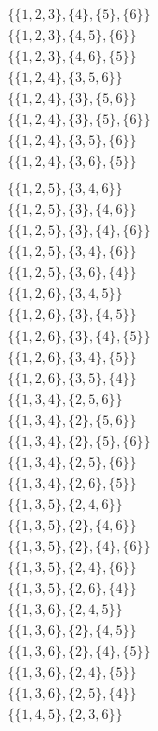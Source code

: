 \documentclass[11pt]{article}
\begin{document}
\begin{flushleft}
\begin{align*}
\{\{1, 2, 3\}, \{4\}, \{5\}, \{6\}\}\\
\{\{1, 2, 3\}, \{4, 5\}, \{6\}\}\\
\{\{1, 2, 3\}, \{4, 6\}, \{5\}\}\\
\{\{1, 2, 4\}, \{3, 5, 6\}\}\\
\{\{1, 2, 4\}, \{3\}, \{5, 6\}\}\\
\{\{1, 2, 4\}, \{3\}, \{5\}, \{6\}\}\\
\{\{1, 2, 4\}, \{3, 5\}, \{6\}\}\\
\{\{1, 2, 4\}, \{3, 6\}, \{5\}\}\\
\end{align*}
\begin{align*}
\{\{1, 2, 5\}, \{3, 4, 6\}\}\\
\{\{1, 2, 5\}, \{3\}, \{4, 6\}\}\\
\{\{1, 2, 5\}, \{3\}, \{4\}, \{6\}\}\\
\{\{1, 2, 5\}, \{3, 4\}, \{6\}\}\\
\{\{1, 2, 5\}, \{3, 6\}, \{4\}\}\\
\{\{1, 2, 6\}, \{3, 4, 5\}\}\\
\{\{1, 2, 6\}, \{3\}, \{4, 5\}\}\\
\{\{1, 2, 6\}, \{3\}, \{4\}, \{5\}\}\\
\{\{1, 2, 6\}, \{3, 4\}, \{5\}\}\\
\{\{1, 2, 6\}, \{3, 5\}, \{4\}\}\\
\{\{1, 3, 4\}, \{2, 5, 6\}\}\\
\{\{1, 3, 4\}, \{2\}, \{5, 6\}\}\\
\{\{1, 3, 4\}, \{2\}, \{5\}, \{6\}\}\\
\{\{1, 3, 4\}, \{2, 5\}, \{6\}\}\\
\{\{1, 3, 4\}, \{2, 6\}, \{5\}\}\\
\{\{1, 3, 5\}, \{2, 4, 6\}\}\\
\{\{1, 3, 5\}, \{2\}, \{4, 6\}\}\\
\{\{1, 3, 5\}, \{2\}, \{4\}, \{6\}\}\\
\{\{1, 3, 5\}, \{2, 4\}, \{6\}\}\\
\{\{1, 3, 5\}, \{2, 6\}, \{4\}\}\\
\{\{1, 3, 6\}, \{2, 4, 5\}\}\\
\{\{1, 3, 6\}, \{2\}, \{4, 5\}\}\\
\{\{1, 3, 6\}, \{2\}, \{4\}, \{5\}\}\\
\{\{1, 3, 6\}, \{2, 4\}, \{5\}\}\\
\{\{1, 3, 6\}, \{2, 5\}, \{4\}\}\\
\{\{1, 4, 5\}, \{2, 3, 6\}\}\\

\end{align*}
\end{flushleft}
\end{document}
